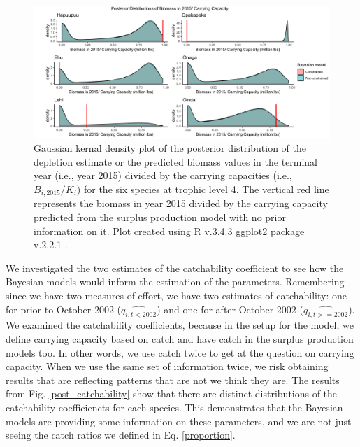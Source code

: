 \documentclass[oneside,12pt,final]{sty/ucthesis-CA2012}
\let\cite\citep                             %
\begin{document}
\begin{mainmatter}
\begin{figure}[H]
     \centering
       \includegraphics[width=\textwidth]{fig/post_terminal_bio_k}
    \caption{Gaussian kernal density plot of the posterior distribution of the depletion estimate or the predicted biomass values in the terminal year (i.e., year 2015) divided by the carrying capacities (i.e., $B_{i,2015}/K_i$) for the six species at trophic level 4. The vertical red line represents the biomass in year 2015 divided by the carrying capacity predicted from the surplus production model with no prior information on it. Plot created using R v.3.4.3 \cite{Rcite} ggplot2 package v.2.2.1 \cite{ggplot}.}
    \label{post_term_b_k}
\end{figure}

We investigated the two estimates of the catchability coefficient to see how the Bayesian models would inform the estimation of the parameters. Remembering since we have two measures of effort, we have two estimates of catchability: one for prior to October 2002 ($\widehat{q_{i,t<2002}}$) and one for after October 2002 ($\widehat{q_{i,t>=2002}}$). We examined the catchability coefficients, because in the setup for the model, we define carrying capacity based on catch and  have catch in the surplus production models too. In other words, we use catch twice to get at the question on carrying capacity. When we use the same set of information twice, we risk obtaining results that are reflecting patterns that are not we think they are. The results from Fig. \ref{post_catchability} show that there are distinct distributions of the catchability coefficiencts for each species. This demonstrates that the Bayesian models are providing some information on these parameters, and we are not just seeing the catch ratios we defined in Eq. \ref{proportion}.


\end{mainmatter}
\end{document}

